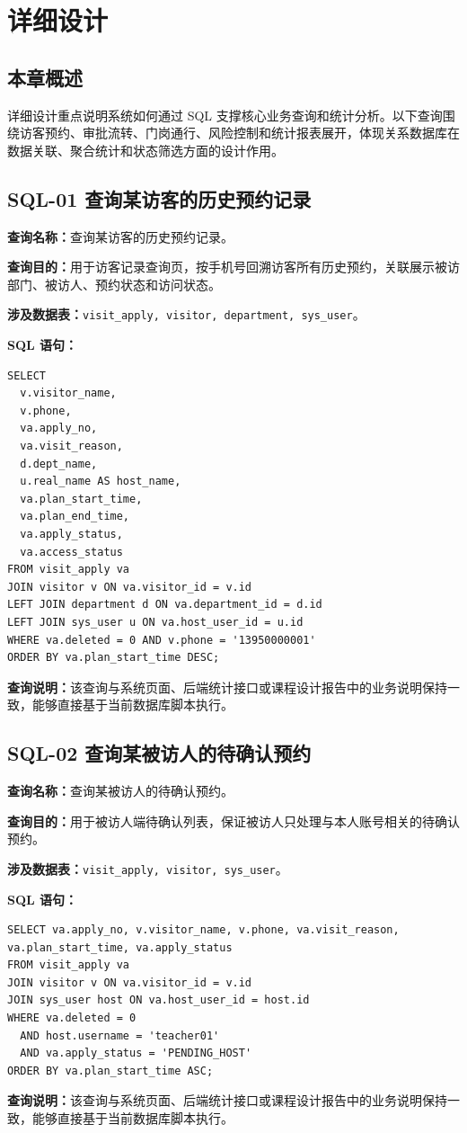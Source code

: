 \section{详细设计}
\subsection{本章概述}
详细设计重点说明系统如何通过 SQL 支撑核心业务查询和统计分析。以下查询围绕访客预约、审批流转、门岗通行、风险控制和统计报表展开，体现关系数据库在数据关联、聚合统计和状态筛选方面的设计作用。

\subsection{SQL-01 查询某访客的历史预约记录}
\textbf{查询名称：}查询某访客的历史预约记录。\par
\textbf{查询目的：}用于访客记录查询页，按手机号回溯访客所有历史预约，关联展示被访部门、被访人、预约状态和访问状态。\par
\textbf{涉及数据表：}\texttt{visit\_apply, visitor, department, sys\_user}。\par
\textbf{SQL 语句：}
\begin{lstlisting}[style=sqlstyle]
SELECT
  v.visitor_name,
  v.phone,
  va.apply_no,
  va.visit_reason,
  d.dept_name,
  u.real_name AS host_name,
  va.plan_start_time,
  va.plan_end_time,
  va.apply_status,
  va.access_status
FROM visit_apply va
JOIN visitor v ON va.visitor_id = v.id
LEFT JOIN department d ON va.department_id = d.id
LEFT JOIN sys_user u ON va.host_user_id = u.id
WHERE va.deleted = 0 AND v.phone = '13950000001'
ORDER BY va.plan_start_time DESC;
\end{lstlisting}
\textbf{查询说明：}该查询与系统页面、后端统计接口或课程设计报告中的业务说明保持一致，能够直接基于当前数据库脚本执行。

\subsection{SQL-02 查询某被访人的待确认预约}
\textbf{查询名称：}查询某被访人的待确认预约。\par
\textbf{查询目的：}用于被访人端待确认列表，保证被访人只处理与本人账号相关的待确认预约。\par
\textbf{涉及数据表：}\texttt{visit\_apply, visitor, sys\_user}。\par
\textbf{SQL 语句：}
\begin{lstlisting}[style=sqlstyle]
SELECT va.apply_no, v.visitor_name, v.phone, va.visit_reason, va.plan_start_time, va.apply_status
FROM visit_apply va
JOIN visitor v ON va.visitor_id = v.id
JOIN sys_user host ON va.host_user_id = host.id
WHERE va.deleted = 0
  AND host.username = 'teacher01'
  AND va.apply_status = 'PENDING_HOST'
ORDER BY va.plan_start_time ASC;
\end{lstlisting}
\textbf{查询说明：}该查询与系统页面、后端统计接口或课程设计报告中的业务说明保持一致，能够直接基于当前数据库脚本执行。

